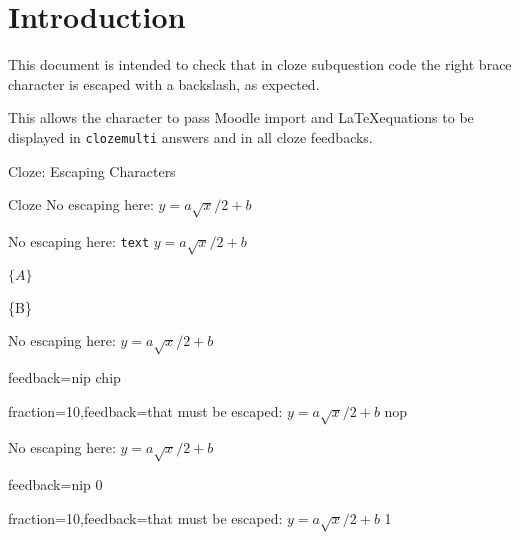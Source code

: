 \documentclass{article}
\def\myequation{y=a\sqrt{x}/2+{b}}
\begin{document}
\section*{Introduction}

This document is intended to check that in cloze subquestion code the right 
brace character is escaped with a backslash, as expected.

This allows the character to pass Moodle import and \LaTeX equations to be 
displayed in \texttt{clozemulti} answers and in all cloze feedbacks.

\begin{quiz}{Cloze: Escaping Characters}

\begin{cloze}[points=2]{Cloze}
No escaping here: $\myequation$

\begin{multi}[points=4,vertical,shuffle=false]
No escaping here: \texttt{text} $\myequation$
\item* $\lbrace A\rbrace$
\item \{B\}
\end{multi}

\begin{shortanswer}
{No escaping here: } $\myequation$
\item[feedback={nip}] chip
\item[fraction=10,feedback={that must be escaped: $\myequation$}] nop
\end{shortanswer}

\begin{numerical}
{No escaping here: } $\myequation$
\item[feedback={nip}] 0
\item[fraction=10,feedback={that must be escaped: $\myequation$}] 1
\end{numerical}

\end{cloze}

\end{quiz}
\end{document}

